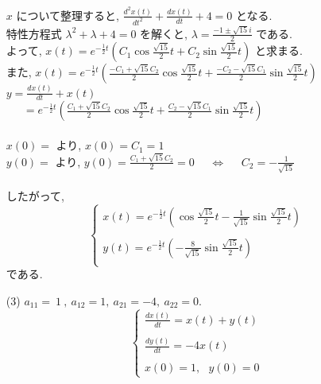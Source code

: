 \documentclass[11pt]{jsarticle}
\begin{document}
\begin{itemize}
$x$ について整理すると, $\displaystyle \frac{d^{2}x(t)}{dt^{2}} + \frac{dx(t)}{dt} + 4 = 0$ となる. \\
特性方程式 $\lambda^{2} + \lambda + 4 = 0$ を解くと, $\lambda = \displaystyle \frac{-1 \pm \sqrt{15}i}{2}$ である. \\
よって, $\displaystyle x(t) = e^{-\frac{1}{2}t}\left( C_{1} \cos{\frac{\sqrt{15}}{2}t} + C_{2} \sin{\frac{\sqrt{15}}{2}t}\right)$ と求まる. \\
また, $\displaystyle x(t) = e^{-\frac{1}{2}t}\left( \frac{-C_{1} + \sqrt{15}C_{2}}{2} \cos{\frac{\sqrt{15}}{2}t} + \frac{-C_{2} - \sqrt{15}C_{1}}{2} \sin{\frac{\sqrt{15}}{2}t}\right)$\\
$\displaystyle y = \frac{dx(t)}{dt} + x(t) $\\
\ \ \ $\displaystyle = e^{-\frac{1}{2}t}\left( \frac{C_{1} + \sqrt{15}C_{2}}{2} \cos{\frac{\sqrt{15}}{2}t} + \frac{C_{2} - \sqrt{15}C_{1}}{2} \sin{\frac{\sqrt{15}}{2}t}\right)$\\ \\
$x(0) = $ より, $x(0) = C_{1} = 1$\\
$y(0) = $ より, $\displaystyle y(0) = \frac{C_{1} + \sqrt{15}C_{2}}{2} = 0$ \ \ $\Leftrightarrow$ \ \ $\displaystyle C_{2} = -\frac{1}{\sqrt{15}}$\\ \\
したがって, 
\[\left\{ 
\begin{array}{l}
\displaystyle x(t) = e^{-\frac{1}{2}t}\left( \cos{\frac{\sqrt{15}}{2}t} - \frac{1}{\sqrt{15}}\sin{\frac{\sqrt{15}}{2}t}\right) \\ \\
\displaystyle y(t) = e^{-\frac{1}{2}t}\left(-\frac{8}{\sqrt{15}}\sin{\frac{\sqrt{15}}{2}t}\right) \\
\end{array}
\right. \]
である. 
\ \\
\item[(3)] $a_{11} = \ 1\ , \ a_{12} = 1, \ a_{21} = -4, \ a_{22} = 0$.
\[\left\{ 
\begin{array}{l}
\displaystyle \frac{dx(t)}{dt} = x(t) + y(t) \\ \\
\displaystyle \frac{dy(t)}{dt} = -4x(t) \\ \\
x(0) = 1,\ \ \  y(0) = 0
\end{array}
\right.\]


\end{itemize}
\end{document}
